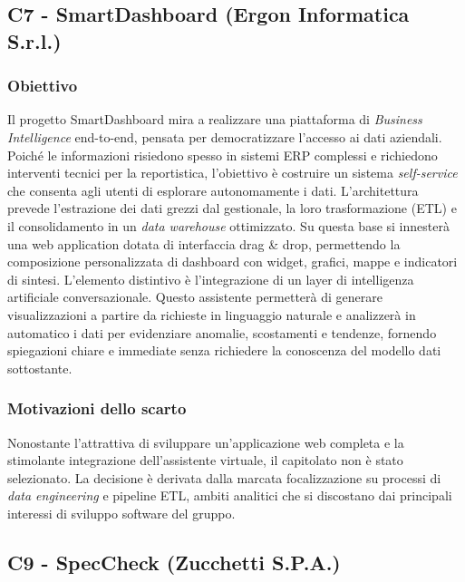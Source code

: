 \documentclass[11pt, a4paper]{article}
\begin{document}
\subsection{C7 - SmartDashboard (Ergon Informatica S.r.l.)}
\subsubsection{Obiettivo}
Il progetto SmartDashboard mira a realizzare una piattaforma di \textit{Business Intelligence} end-to-end, pensata per democratizzare l'accesso ai dati aziendali. Poiché le informazioni risiedono spesso in sistemi ERP complessi e richiedono interventi tecnici per la reportistica, l'obiettivo è costruire un sistema \textit{self-service} che consenta agli utenti di esplorare autonomamente i dati. \newline
L'architettura prevede l'estrazione dei dati grezzi dal gestionale, la loro trasformazione (ETL) e il consolidamento in un \textit{data warehouse} ottimizzato. Su questa base si innesterà una web application dotata di interfaccia drag \& drop, permettendo la composizione personalizzata di dashboard con widget, grafici, mappe e indicatori di sintesi. \newline
L'elemento distintivo è l'integrazione di un layer di intelligenza artificiale conversazionale. Questo assistente permetterà di generare visualizzazioni a partire da richieste in linguaggio naturale e analizzerà in automatico i dati per evidenziare anomalie, scostamenti e tendenze, fornendo spiegazioni chiare e immediate senza richiedere la conoscenza del modello dati sottostante.

\subsubsection{Motivazioni dello scarto}
Nonostante l'attrattiva di sviluppare un'applicazione web completa e la stimolante integrazione dell'assistente virtuale, il capitolato non è stato selezionato. La decisione è derivata dalla marcata focalizzazione su processi di \textit{data engineering} e pipeline ETL, ambiti analitici che si discostano dai principali interessi di sviluppo software del gruppo.

\subsection{C9 - SpecCheck (Zucchetti S.P.A.)}
\end{document}
